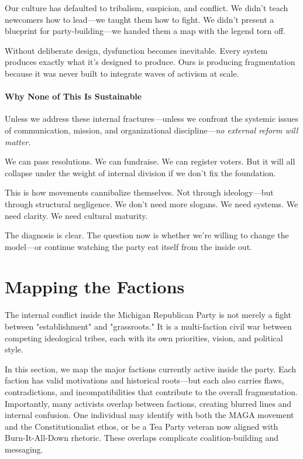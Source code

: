 Our culture has defaulted to tribalism, suspicion, and conflict. We didn’t teach newcomers how to lead—we taught them how to fight. We didn’t present a blueprint for party-building—we handed them a map with the legend torn off.

Without deliberate design, dysfunction becomes inevitable. Every system produces exactly what it’s designed to produce. Ours is producing fragmentation because it was never built to integrate waves of activism at scale.

\subsubsection{Why None of This Is Sustainable}
Unless we address these internal fractures—unless we confront the systemic issues of communication, mission, and organizational discipline—\textit{no external reform will matter.}

We can pass resolutions. We can fundraise. We can register voters. But it will all collapse under the weight of internal division if we don’t fix the foundation.

This is how movements cannibalize themselves. Not through ideology—but through structural negligence. We don’t need more slogans. We need systems. We need clarity. We need cultural maturity.

The diagnosis is clear. The question now is whether we’re willing to change the model—or continue watching the party eat itself from the inside out.


\chapter{Mapping the Factions}

The internal conflict inside the Michigan Republican Party is not merely a fight between "establishment" and "grassroots." It is a multi-faction civil war between competing ideological tribes, each with its own priorities, vision, and political style.

In this section, we map the major factions currently active inside the party. Each faction has valid motivations and historical roots—but each also carries flaws, contradictions, and incompatibilities that contribute to the overall fragmentation. Importantly, many activists overlap between factions, creating blurred lines and internal confusion. One individual may identify with both the MAGA movement and the Constitutionalist ethos, or be a Tea Party veteran now aligned with Burn-It-All-Down rhetoric. These overlaps complicate coalition-building and messaging.

